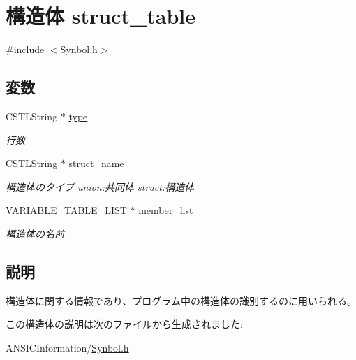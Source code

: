 \section{構造体 struct\_\-table}
\label{structstruct__table}


{\ttfamily \#include $<$Synbol.h$>$}

\subsection*{変数}
\begin{DoxyCompactItemize}
\item 
CSTLString $\ast$ \hyperlink{structstruct__table_aa24e637ea09371ee5332357c141541f2}{type}\label{structstruct__table_aa24e637ea09371ee5332357c141541f2}

\begin{DoxyCompactList}\small\item\em 行数 \item\end{DoxyCompactList}\item 
CSTLString $\ast$ \hyperlink{structstruct__table_ac49bae1a4a5f05919ac8341b1406154d}{struct\_\-name}\label{structstruct__table_ac49bae1a4a5f05919ac8341b1406154d}

\begin{DoxyCompactList}\small\item\em 構造体のタイプ union:共同体 struct:構造体 \item\end{DoxyCompactList}\item 
VARIABLE\_\-TABLE\_\-LIST $\ast$ \hyperlink{structstruct__table_af8a062298d679adae14b0303053d45a8}{member\_\-list}\label{structstruct__table_af8a062298d679adae14b0303053d45a8}

\begin{DoxyCompactList}\small\item\em 構造体の名前 \item\end{DoxyCompactList}\end{DoxyCompactItemize}


\subsection{説明}
構造体に関する情報であり、プログラム中の構造体の識別するのに用いられる。 

この構造体の説明は次のファイルから生成されました:\begin{DoxyCompactItemize}
\item 
ANSICInformation/\hyperlink{Synbol_8h}{Synbol.h}\end{DoxyCompactItemize}
